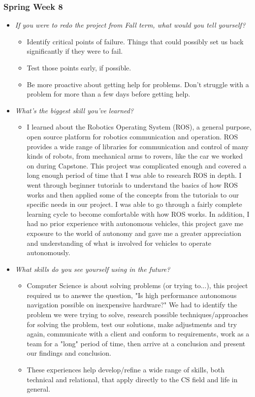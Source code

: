 \documentclass[compsoc,draftclsnofoot,onecolumn,10pt]{IEEEtran}
\begin{document}
\subsubsection{Spring Week 8}
\begin{itemize}
    \item \textit{If you were to redo the project from Fall term, what would you tell yourself?}
    \begin{itemize}
        \item Identify critical points of failure. Things that could possibly set us back significantly if they were to fail.
        \item Test those points early, if possible.
        \item Be more proactive about getting help for problems. Don't struggle with a problem for more than a few days before getting help.
    \end{itemize}

    \item \textit{What's the biggest skill you've learned?}
    \begin{itemize}
        \item I learned about the Robotics Operating System (ROS), a general purpose, open source platform for robotics communication and operation. ROS provides a wide range of libraries for communication and control of many kinds of robots, from mechanical arms to rovers, like the car we worked on during Capstone. This project was complicated enough and covered a long enough period of time that I was able to research ROS in depth. I went through beginner tutorials to understand the basics of how ROS works and then applied some of the concepts from the tutorials to our specific needs in our project. I was able to go through a fairly complete learning cycle to become comfortable with how ROS works. In addition, I had no prior experience with autonomous vehicles, this project gave me exposure to the world of autonomy and gave me a greater appreciation and understanding of what is involved for vehicles to operate autonomously.
    \end{itemize}

    \item \textit{What skills do you see yourself using in the future?}
    \begin{itemize}
        \item Computer Science is about solving problems (or trying to...), this project required us to answer the question, "Is high performance autonomous navigation possible on inexpensive hardware?" We had to identify the problem we were trying to solve, research possible techniques/approaches for solving the problem, test our solutions, make adjustments and try again, communicate with a client and conform to requirements, work as a team for a "long" period of time, then arrive at a conclusion and present our findings and conclusion.
        \item These experiences help develop/refine a wide range of skills, both technical and relational, that apply directly to the CS field and life in general.
    \end{itemize}


\end{itemize}
\end{document}
